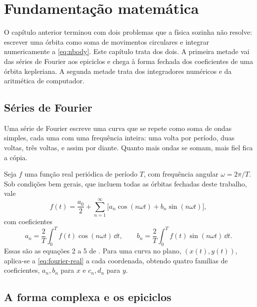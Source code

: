\chapter{Fundamentação matemática}\label{cap:matematica}

O capítulo anterior terminou com dois problemas que a física sozinha não resolve: escrever uma órbita como soma de movimentos circulares e integrar numericamente a \autoref{eq:nbody}. Este capítulo trata dos dois. A primeira metade vai das séries de Fourier aos epiciclos e chega à forma fechada dos coeficientes de uma órbita kepleriana. A segunda metade trata dos integradores numéricos e da aritmética de computador.

\section{Séries de Fourier}\label{sec:fourier-real}

\begin{paracomecar}
Uma série de Fourier escreve uma curva que se repete como soma de ondas simples, cada uma com uma frequência inteira: uma volta por período, duas voltas, três voltas, e assim por diante. Quanto mais ondas se somam, mais fiel fica a cópia.
\end{paracomecar}

Seja $f$ uma função real periódica de período $T$, com frequência angular $\omega = 2\pi/T$. Sob condições bem gerais, que incluem todas as órbitas fechadas deste trabalho, vale \cite{thomas2009}
\begin{equation}
  f(t) = \frac{a_0}{2} + \sum_{n=1}^{\infty}\bigl[a_n\cos(n\omega t) + b_n\sin(n\omega t)\bigr],
  \label{eq:fourier-real}
\end{equation}
com coeficientes
\begin{equation}
  a_n = \frac{2}{T}\int_0^T f(t)\cos(n\omega t)\,\dd t,\qquad
  b_n = \frac{2}{T}\int_0^T f(t)\sin(n\omega t)\,\dd t.
  \label{eq:fourier-coef-real}
\end{equation}
Essas são as equações 2 a 5 de . Para uma curva no plano, $(x(t),y(t))$, aplica-se a \autoref{eq:fourier-real} a cada coordenada, obtendo quatro famílias de coeficientes, $a_n,b_n$ para $x$ e $c_n,d_n$ para $y$.

\section{A forma complexa e os epiciclos}\label{sec:fourier-complexa}

